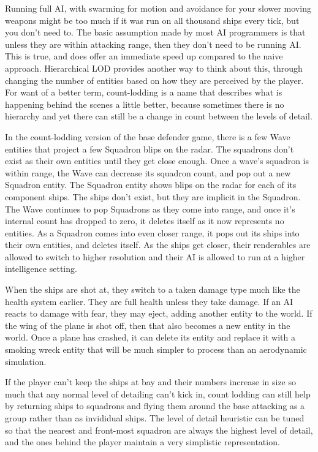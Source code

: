 Running full AI, with swarming for motion and avoidance for your slower moving
weapons might be too much if it was run on all thousand ships every tick, but
you don't need to. The basic assumption made by most AI programmers is that
unless they are within attacking range, then they don't need to be running AI.
This is true, and does offer an immediate speed up compared to the naive
approach. Hierarchical LOD provides another way to think about this, through
changing the number of entities based on how they are perceived by the player.
For want of a better term, count-lodding is a name that describes what is
happening behind the scenes a little better, because sometimes there is no
hierarchy and yet there can still be a change in count between the levels of
detail.

In the count-lodding version of the base defender game, there is a few Wave
entities that project a few Squadron blips on the radar. The squadrons don't
exist as their own entities until they get close enough. Once a wave's squadron
is within range, the Wave can decrease its squadron count, and pop out a new
Squadron entity. The Squadron entity shows blips on the radar for each of its
component ships. The ships don't exist, but they are implicit in the Squadron.
The Wave continues to pop Squadrons as they come into range, and once it's
internal count has dropped to zero, it deletes itself as it now represents no
entities. As a Squadron comes into even closer range, it pops out its ships
into their own entities, and deletes itself. As the ships get closer, their
renderables are allowed to switch to higher resolution and their AI is allowed
to run at a higher intelligence setting.

When the ships are shot at, they switch to a taken damage type much like the
health system earlier. They are full health unless they take damage. If an AI
reacts to damage with fear, they may eject, adding another entity to the world.
If the wing of the plane is shot off, then that also becomes a new entity in
the world. Once a plane has crashed, it can delete its entity and replace it
with a smoking wreck entity that will be much simpler to process than an
aerodynamic simulation.

If the player can't keep the ships at bay and their numbers increase in size so
much that any normal level of detailing can't kick in, count lodding can still
help by returning ships to squadrons and flying them around the base attacking
as a group rather than as invididual ships. The level of detail heuristic can
be tuned so that the nearest and front-most squadron are always the highest
level of detail, and the ones behind the player maintain a very simplistic
representation.

